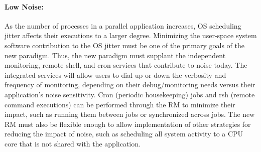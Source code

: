 \documentclass[10pt]{article}
\newcommand{\ngrm}{NGRM}
\begin{document}
%
%

\paragraph{Low Noise:}
As the number of processes in a parallel application increases, 
OS scheduling jitter affects their executions to a larger degree.
Minimizing
the user-space system software contribution to the OS jitter must be one 
of the primary goals of the new paradigm.  Thus, the new paradigm must supplant
the independent monitoring, remote shell, and cron
services that contribute to noise today. The integrated services will
allow users to dial up or down the verbosity and frequency of monitoring,
depending on their debug/monitoring needs versus their application's noise
sensitivity. Cron (periodic housekeeping) jobs and rsh (remote command
executions) can be performed through the RM to minimize their impact,
such as running them between jobs or synchronized across jobs. 
The new RM must also be flexible enough to allow implementation of other
strategies for reducing the impact of noise, such as scheduling all
system activity to a CPU core that is not shared with the application.
\end{document}
